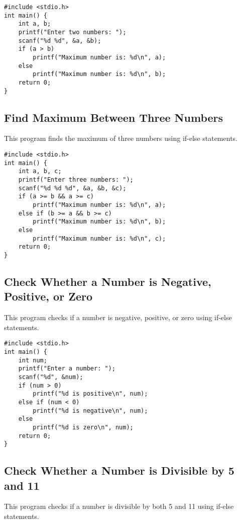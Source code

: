\documentclass[a4paper,12pt]{article}
\begin{document}
\begin{lstlisting}[caption={Find Maximum Between Two Numbers}]
#include <stdio.h>
int main() {
    int a, b;
    printf("Enter two numbers: ");
    scanf("%d %d", &a, &b);
    if (a > b)
        printf("Maximum number is: %d\n", a);
    else
        printf("Maximum number is: %d\n", b);
    return 0;
}
\end{lstlisting}

\newpage

\subsection{Find Maximum Between Three Numbers}
This program finds the maximum of three numbers using if-else statements.

\begin{lstlisting}[caption={Find Maximum Between Three Numbers}]
#include <stdio.h>
int main() {
    int a, b, c;
    printf("Enter three numbers: ");
    scanf("%d %d %d", &a, &b, &c);
    if (a >= b && a >= c)
        printf("Maximum number is: %d\n", a);
    else if (b >= a && b >= c)
        printf("Maximum number is: %d\n", b);
    else
        printf("Maximum number is: %d\n", c);
    return 0;
}
\end{lstlisting}

\newpage

\subsection{Check Whether a Number is Negative, Positive, or Zero}
This program checks if a number is negative, positive, or zero using if-else statements.

\begin{lstlisting}[caption={Check Whether a Number is Negative, Positive, or Zero}]
#include <stdio.h>
int main() {
    int num;
    printf("Enter a number: ");
    scanf("%d", &num);
    if (num > 0)
        printf("%d is positive\n", num);
    else if (num < 0)
        printf("%d is negative\n", num);
    else
        printf("%d is zero\n", num);
    return 0;
}
\end{lstlisting}

\newpage

\subsection{Check Whether a Number is Divisible by 5 and 11}
This program checks if a number is divisible by both 5 and 11 using if-else statements.
\end{document}
